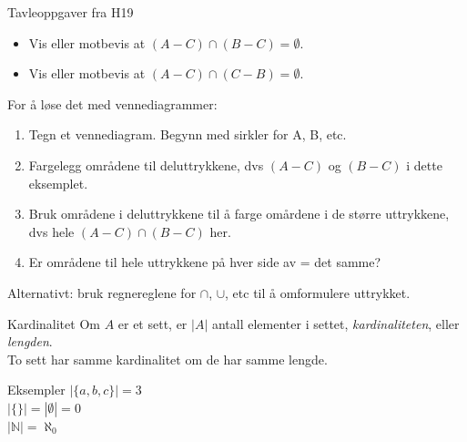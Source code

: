 \begin{frame}{Tavleoppgaver fra H19}
    \begin{itemize}
        \item Vis eller motbevis at $(A - C) \cap (B - C) = \emptyset.$
        \item Vis eller motbevis at $(A - C) \cap (C - B) = \emptyset.$
    \end{itemize}
    
    For å løse det med vennediagrammer:
    \begin{enumerate}
        \item Tegn et vennediagram. Begynn med sirkler for A, B, etc.
        \item Fargelegg områdene til deluttrykkene, dvs $(A - C)$ og $(B - C)$ i dette eksemplet.
        \item Bruk områdene i deluttrykkene til å farge omårdene i de større uttrykkene, dvs hele $(A - C) \cap (B - C)$ her.
        \item Er områdene til hele uttrykkene på hver side av = det samme?
    \end{enumerate}
    \pause
    Alternativt: bruk regnereglene for $\cap$, $\cup$, etc til å omformulere uttrykket.
\end{frame}

\begin{frame}{Kardinalitet}
    Om $A$ er et sett, er $|A|$ antall elementer i settet, \textit{kardinaliteten}, eller \textit{lengden}.\\
    To sett har samme kardinalitet om de har samme lengde.
    \begin{block}{Eksempler}
        $|\{a, b, c\}| = 3$ \\
        $|\{\}| = |\emptyset| = 0$\\
        $|\mathbb{N}| = \aleph_0$
    \end{block}
\end{frame}